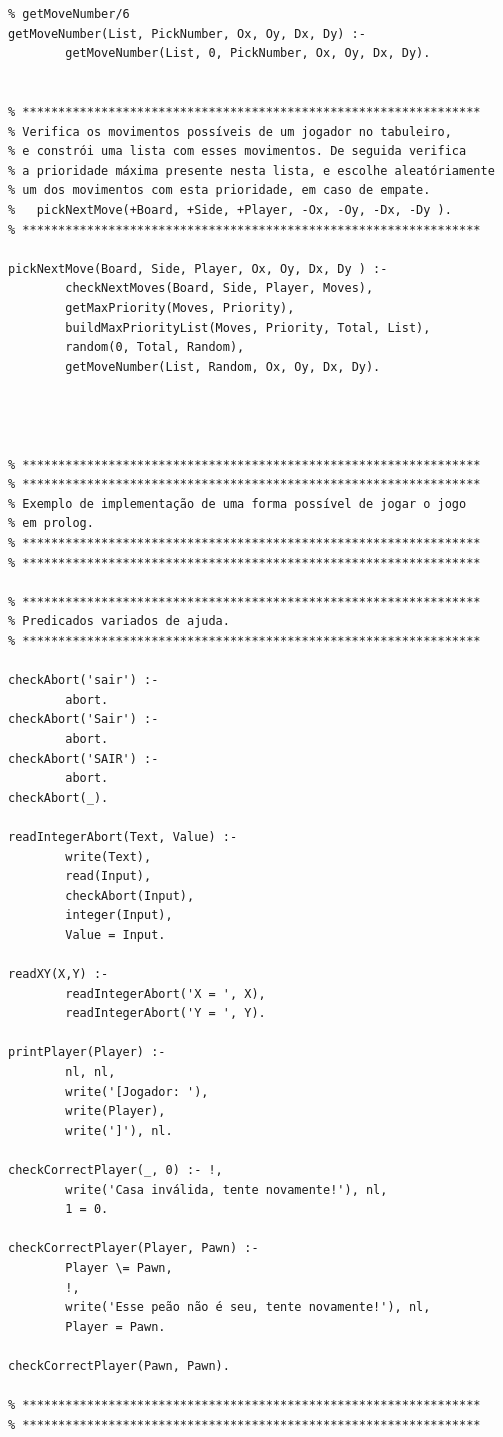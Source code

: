\documentclass[15pt,a4paper]{article}
\begin{document}
\begin{lstlisting}
% getMoveNumber/6
getMoveNumber(List, PickNumber, Ox, Oy, Dx, Dy) :-
		getMoveNumber(List, 0, PickNumber, Ox, Oy, Dx, Dy).


% ****************************************************************
% Verifica os movimentos possíveis de um jogador no tabuleiro,
% e constrói uma lista com esses movimentos. De seguida verifica
% a prioridade máxima presente nesta lista, e escolhe aleatóriamente
% um dos movimentos com esta prioridade, em caso de empate.
%	pickNextMove(+Board, +Side, +Player, -Ox, -Oy, -Dx, -Dy ).
% ****************************************************************

pickNextMove(Board, Side, Player, Ox, Oy, Dx, Dy ) :-
		checkNextMoves(Board, Side, Player, Moves),
		getMaxPriority(Moves, Priority),
		buildMaxPriorityList(Moves, Priority, Total, List),
		random(0, Total, Random),
		getMoveNumber(List, Random, Ox, Oy, Dx, Dy).
		
		
		
		
% ****************************************************************
% ****************************************************************
% Exemplo de implementação de uma forma possível de jogar o jogo
% em prolog.
% ****************************************************************
% ****************************************************************

% ****************************************************************
% Predicados variados de ajuda.
% ****************************************************************

checkAbort('sair') :-
		abort.
checkAbort('Sair') :-
		abort.
checkAbort('SAIR') :-
		abort.
checkAbort(_).

readIntegerAbort(Text, Value) :-
		write(Text),
		read(Input),
		checkAbort(Input),
		integer(Input),
		Value = Input.
		
readXY(X,Y) :-
		readIntegerAbort('X = ', X),
		readIntegerAbort('Y = ', Y).
		
printPlayer(Player) :-
		nl, nl,
		write('[Jogador: '),
		write(Player),
		write(']'), nl.

checkCorrectPlayer(_, 0) :- !,
		write('Casa inválida, tente novamente!'), nl,
		1 = 0.
		
checkCorrectPlayer(Player, Pawn) :-
		Player \= Pawn,
		!,
		write('Esse peão não é seu, tente novamente!'), nl,
		Player = Pawn.
		
checkCorrectPlayer(Pawn, Pawn).

% ****************************************************************
% ****************************************************************


\end{lstlisting}
\end{document}
